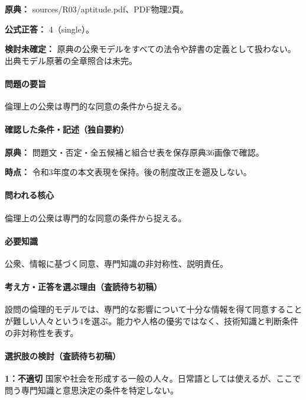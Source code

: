 \noindent\textbf{原典：} sources/R03/aptitude.pdf、PDF物理2頁。

\textbf{公式正答：} 4（single）。

\par\textbf{検討未確定：} 原典の公衆モデルをすべての法令や辞書の定義として扱わない。出典モデル原著の全章照合は未完。

\paragraph{問題の要旨} 倫理上の公衆は専門的な同意の条件から捉える。

\paragraph{確認した条件・記述（独自要約）}\mbox{}\par

\noindent\textbf{原典：} 問題文・否定・全五候補と組合せ表を保存原典36画像で確認。\par

\noindent\textbf{時点：} 令和3年度の本文表現を保持。後の制度改正を遡及しない。\par

\paragraph{問われる核心} 倫理上の公衆は専門的な同意の条件から捉える。

\paragraph{必要知識} 公衆、情報に基づく同意、専門知識の非対称性、説明責任。

\paragraph{考え方・正答を選ぶ理由（査読待ち初稿）} 設問の倫理的モデルでは、専門的な影響について十分な情報を得て同意することが難しい人々という4を選ぶ。能力や人格の優劣ではなく、技術知識と判断条件の非対称性を表す。

\paragraph{選択肢の検討（査読待ち初稿）}\mbox{}\par

\noindent\textbf{1：不適切} 国家や社会を形成する一般の人々。日常語としては使えるが、ここで問う専門知識と意思決定の条件を特定しない。\par

